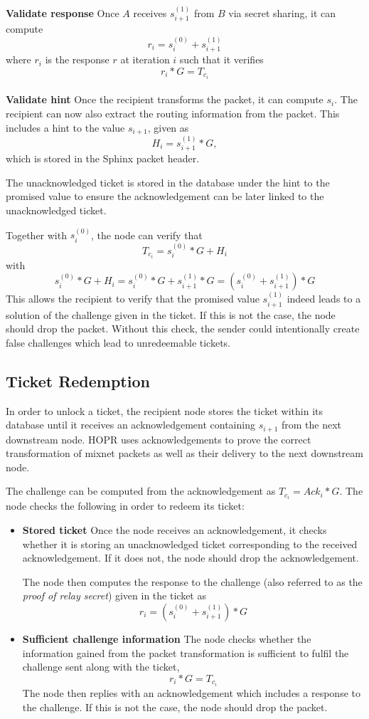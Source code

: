  \textbf{Validate response} Once $A$ receives $s_{i+1}^{(1)}$ from $B$ via secret sharing, it can compute $$r_i=s_i^{(0)}+s_{i+1}^{(1)}$$ where $r_i$ is the response $r$ at iteration $i$ such that it verifies
$$r_i*G=T_{c_i}$$
\\\textbf{Validate hint} Once the recipient transforms the packet, it can compute $s_i$. The recipient can now also extract the routing information from the packet.
This includes a hint to the value $s_{i+1}$, given as $$H_i=s_{i+1}^{(1)}*G,$$ which is stored in the Sphinx packet header.

The unacknowledged ticket is stored in the database under the hint to the promised value to ensure the acknowledgement can be later linked to the unacknowledged ticket.

Together with $s_i^{(0)}$, the node can verify that $$T_{c_i}=s_i^{(0)}*G+H_i$$ with $$s_i^{(0)}*G+H_i=s_i^{(0)}*G+s_{i+1}^{(1)}*G=(s_i^{(0)}+s_{i+1}^{(1)})*G$$
This allows the recipient to verify that the promised value $s_{i+1}^{(1)}$ indeed leads to a solution of the challenge given in the ticket. If this is not the case, the node should drop the packet. Without this check, the sender could intentionally create false challenges which lead to unredeemable tickets.


\subsection{Ticket Redemption}

In order to unlock a ticket, the recipient node stores the ticket within its database until it receives an acknowledgement containing $s_{i+1}$ from the next downstream node. HOPR uses acknowledgements to prove the correct transformation of mixnet packets as well as their delivery to the next downstream node.

The challenge can be computed from the acknowledgement as $T_{c_i}=Ack_i*G$. The node checks the following in order to redeem its ticket:
\begin{itemize}
\item \textbf{Stored ticket} Once the node receives an acknowledgement, it checks whether it is storing an unacknowledged ticket corresponding to the received acknowledgement. If it does not, the node should drop the acknowledgement.

 The node then computes the response to the challenge (also referred to as the \textit{proof of relay secret}) given in the ticket as $$r_i=(s_i^{(0)}+s_{i+1}^{(1)})*G$$
\item  \textbf{Sufficient challenge information} The node checks whether the information gained from the packet transformation is sufficient to fulfil the challenge sent along with the ticket, $$r_i*G=T_{c_i}$$
The node then replies with an acknowledgement which includes a response to the challenge. If this is not the case, the node should drop the packet.
\end{itemize}

